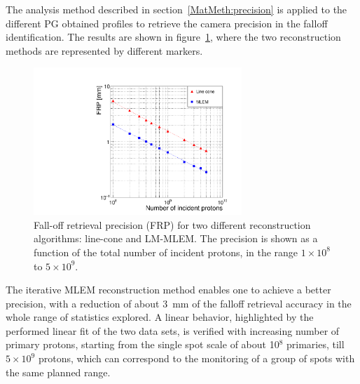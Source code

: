 The analysis method described in section~\ref{MatMeth:precision} is applied to the different PG obtained profiles to retrieve the camera precision in the falloff identification. The results are shown in figure~\ref{fig:precision}, where the two reconstruction methods are represented by different markers.

\begin{figure}	
\centering
\includegraphics[width=0.7\textwidth]{./Figure/new/precisionVSprimaries.pdf}
\caption{Fall-off retrieval precision (FRP) for two different reconstruction algorithms: line-cone and LM-MLEM. The precision is shown as a function of the total number of incident protons, in the range $1\times10^{8}$ to $5\times10^{9}$.}	
\label{fig:precision}
\end{figure}

The iterative MLEM reconstruction method enables one to achieve a better precision, with a reduction of about 3~mm of the falloff retrieval accuracy in the whole range of statistics explored. A linear behavior, highlighted by the performed linear fit of the two data sets, is verified with increasing number of primary protons, starting from the single spot scale of about 10$^8$ primaries, till $5\times10^9$ protons, which can correspond to the monitoring of a group of spots with the same planned range. 


